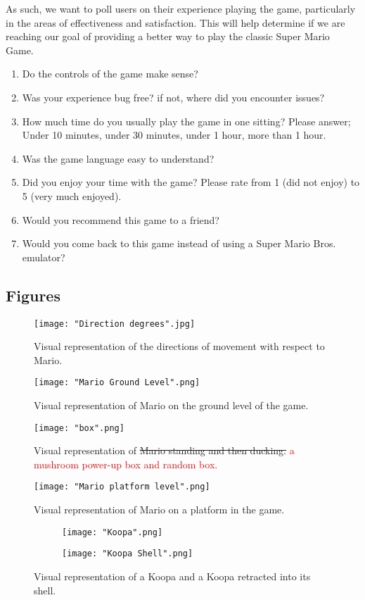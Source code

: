 \documentclass[12pt, titlepage]{article}
\begin{document}
As such, we want to poll users on their experience playing the game, particularly in the areas of effectiveness and satisfaction. This will help determine if we are reaching our goal of providing a better way to play the classic Super Mario Game.

\begin{enumerate}
    \item Do the controls of the game make sense?
    \item Was your experience bug free? if not, where did you encounter issues?
    \item How much time do you usually play the game in one sitting? Please answer; Under 10 minutes, under 30 minutes, under 1 hour, more than 1 hour.
    \item Was the game language easy to understand?
    \item Did you enjoy your time with the game? Please rate from 1 (did not enjoy) to 5 (very much enjoyed).
    \item Would you recommend this game to a friend?
    \item Would you come back to this game instead of using a Super Mario Bros. emulator?
\end{enumerate}

\subsection{Figures}
\begin{figure}[!h]
    \centering
    \texttt{[image: "Direction degrees".jpg]}
    \caption{Visual representation of the directions of movement with respect to Mario.}
\end{figure}

\begin{figure}[!h]
    \centering
    \texttt{[image: "Mario Ground Level".png]}
    \caption{Visual representation of Mario on the ground level of the game.}
\end{figure}

\begin{figure}[!h]
    \centering
    \texttt{[image: "box".png]}
    \caption{Visual representation of \sout{Mario standing and then ducking.} \textcolor{red}{a mushroom power-up box and random box.}}
\end{figure}

\begin{figure}[!h]
    \centering
    \texttt{[image: "Mario platform level".png]}
    \caption{Visual representation of Mario on a platform in the game.}
\end{figure}

\begin{figure}[!h]
    \begin{subfigure}{0.25\textwidth}
        \texttt{[image: "Koopa".png]}
    \end{subfigure}
    \hfill
    \begin{subfigure}{0.25\textwidth}
        \texttt{[image: "Koopa Shell".png]}
    \end{subfigure}
    \caption{Visual representation of a Koopa and a Koopa retracted into its shell.}
\end{figure}
\end{document}
